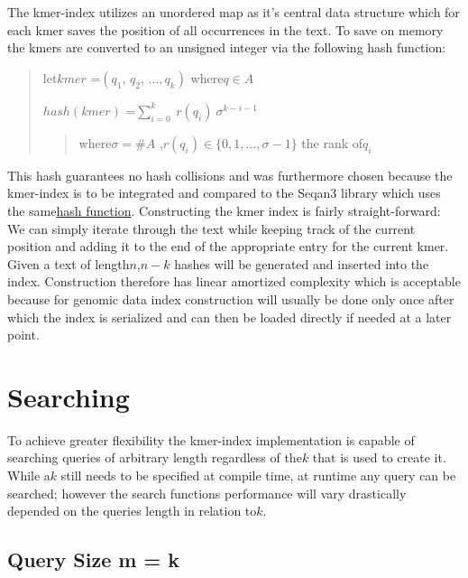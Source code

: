 The kmer-index utilizes an unordered map as it's central data structure
which for each kmer saves the position of all occurrences in the text.
To save on memory the kmers are converted to an unsigned integer via
the following hash function:
\begin{verse}
let$kmer$ =$(q_{1},\,q_{2},\,...,q_{k})$ where$q\in A$

$hash(kmer)$ =$\sum_{i=0}^{k}\:r(q_{i})\:\sigma^{k-i-1}$
\begin{verse}
where$\sigma=\#A$ ,$r(q_{i})\in\{0,1,...,\sigma-1\}$ the rank of$q_{i}$
\end{verse}
\end{verse}
This hash guarantees no hash collisions and was furthermore chosen
because the kmer-index is to be integrated and compared to the Seqan3
library which uses the same\href{http://docs.seqan.de/seqan/3-master-user/group__views.html\#ga6e598d6a021868f704d39df73252974f}{hash function}.
Constructing the kmer index is fairly straight-forward: We can simply
iterate through the text while keeping track of the current position
and adding it to the end of the appropriate entry for the current
kmer. Given a text of length$n$,$n-k$ hashes will be generated and
inserted into the index. Construction therefore has linear amortized
complexity which is acceptable because for genomic data index construction
will usually be done only once after which the index is serialized
and can then be loaded directly if needed at a later point.

\chapter{Searching}

To achieve greater flexibility the kmer-index implementation is capable
of searching queries of arbitrary length regardless of the$k$ that
is used to create it. While a$k$ still needs to be specified at compile
time, at runtime any query can be searched; however the search functions
performance will vary drastically depended on the queries length in
relation to$k$.

\section{\label{section 3.1}Query Size m = k}

